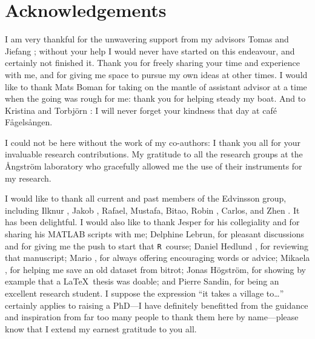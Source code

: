\documentclass[draft,webedition,openright,titles,swedish,english]{LuaUUThesis}\usepackage[]{graphicx}\usepackage[]{xcolor}
\newcommand{\R}{\texttt{R}}
\begin{document}
%

\backmatter


%

\chapter{Acknowledgements}
\label{ch:acknowledgements}

\bgroup
\setlength{\parindent}{0pt}
\setlength{\parskip}{1ex plus 0.5ex minus 0.2ex}


I am very thankful for the unwavering support from my advisors
Tomas  and
Jiefang ;
without your help I would never have started on this endeavour, and certainly
not finished it.
Thank you for freely sharing your time and experience with me, and
for giving me space to pursue my own ideas at other times.
I would like to thank Mats Boman for taking on the mantle of assistant advisor
at a time when the going was rough for me: thank you for helping steady my boat.
And to Kristina  and Torbjörn :
I will never forget your kindness that day at café Fågelsången.


I could not be here without the work of my co-authors: I thank you all for your
invaluable research contributions.
My gratitude to all the research groups at the Ångström laboratory who gracefully
allowed me the use of their instruments for my research.

I would like to thank all current and past members of the Edvinsson group,
including Ilknur , Jakob ,
Rafael, Mustafa, Bitao, Robin , Carlos, and
Zhen . It has been delightful.
I would also like to thank Jesper 
for his collegiality and for sharing his MATLAB scripts with me;
Delphine Lebrun, for pleasant discussions and for giving me the push to start that \R\ course;
Daniel Hedlund , for reviewing that manuscript;
Mario , for always offering encouraging words or advice;
Mikaela , for helping me save an old dataset from bitrot;
Jonas Högström, for showing by example that a \LaTeX\ thesis was doable;
and Pierre Sandin, for being an excellent research student.
%
I suppose the expression \enquote{it takes a village to\ldots} certainly applies to raising
a PhD---I have definitely benefitted from the guidance and inspiration from far
too many people to thank them here by name---please know that I extend my
earnest gratitude to you all.
\end{document}
